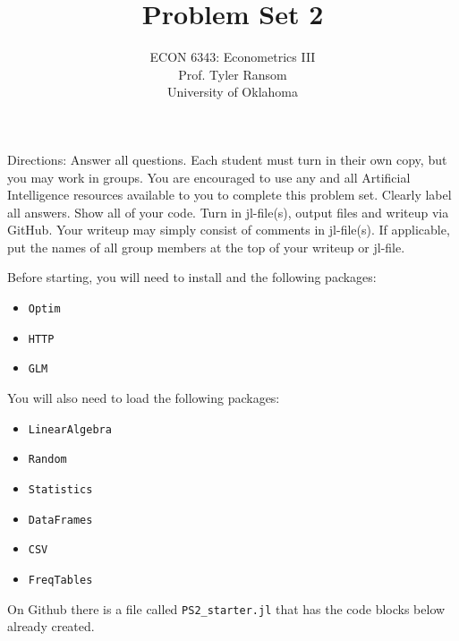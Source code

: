 \documentclass[12pt,english]{article}
\begin{document}
\title{Problem Set 2}
\author{ECON 6343: Econometrics III\\
Prof. Tyler Ransom\\
University of Oklahoma}
\date{}%

\maketitle
Directions: Answer all questions. Each student must turn in their own copy, but you may work in groups. You are encouraged to use any and all Artificial Intelligence resources available to you to complete this problem set. Clearly label all answers. Show all of your code. Turn in jl-file(s), output files and writeup via GitHub. Your writeup may simply consist of comments in jl-file(s). If applicable, put the names of all group members at the top of your writeup or jl-file.


Before starting, you will need to install and the following packages:
\begin{itemize}
    \item[~] \texttt{Optim} 
    \item[~] \texttt{HTTP} 
    \item[~] \texttt{GLM} 
\end{itemize}

You will also need to load the following packages:
\begin{itemize}
    \item[~] \texttt{LinearAlgebra} 
    \item[~] \texttt{Random} 
    \item[~] \texttt{Statistics} 
    \item[~] \texttt{DataFrames} 
    \item[~] \texttt{CSV} 
    \item[~] \texttt{FreqTables}
\end{itemize}

On Github there is a file called \texttt{PS2\_starter.jl} that has the code blocks below already created.
\end{document}
